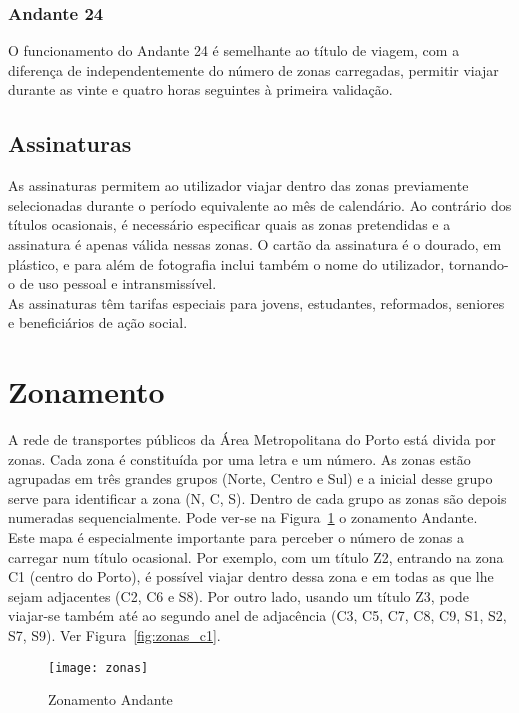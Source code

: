 \subsubsection{Andante 24}

O funcionamento do Andante 24 é semelhante ao título de viagem, com a diferença de independentemente do número de zonas carregadas, permitir viajar durante as vinte e quatro horas seguintes à primeira validação.

\subsection{Assinaturas}

As assinaturas permitem ao utilizador viajar dentro das zonas previamente selecionadas durante o período equivalente ao mês de calendário. Ao contrário dos títulos ocasionais, é necessário especificar quais as zonas pretendidas e a assinatura é apenas válida nessas zonas. O cartão da assinatura é o dourado, em plástico, e para além de fotografia inclui também o nome do utilizador, tornando-o de uso pessoal e intransmissível.
\\As assinaturas têm tarifas especiais para jovens, estudantes, reformados, seniores e beneficiários de ação social.

\section{Zonamento}

A rede de transportes públicos da Área Metropolitana do Porto está divida por zonas. Cada zona é constituída por uma letra e um número. As zonas estão agrupadas em três grandes grupos (Norte, Centro e Sul) e a inicial desse grupo serve para identificar a zona (N, C, S). Dentro de cada grupo as zonas são depois numeradas sequencialmente. Pode ver-se na Figura~\ref{fig:zonas} o zonamento Andante.
\\Este mapa é especialmente importante para perceber o número de zonas a carregar num título ocasional. Por exemplo, com um título Z2, entrando na zona C1 (centro do Porto), é possível viajar dentro dessa zona e em todas as que lhe sejam adjacentes (C2, C6 e S8). Por outro lado, usando um título Z3, pode viajar-se também até ao segundo anel de adjacência (C3, C5, C7, C8, C9, S1, S2, S7, S9). Ver Figura~\ref{fig:zonas_c1}.

\begin{figure}[t]
  \begin{center}
    \leavevmode
    \texttt{[image: zonas]}
    \caption{Zonamento Andante}
    \label{fig:zonas}
  \end{center}
\end{figure}


